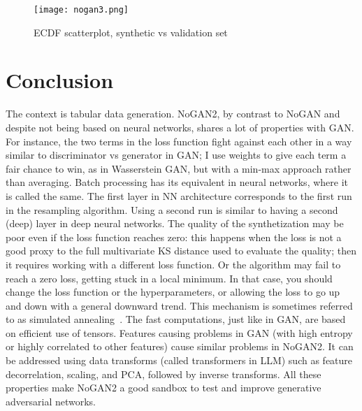 \documentclass[oneside,10pt]{book}
\begin{document}
\begin{figure}[H]
\centering
\texttt{[image: nogan3.png]} %
\caption{ECDF scatterplot, synthetic vs validation set}
\label{fig:nogan3h}
\end{figure}


\section{Conclusion}

The context is tabular data generation.
NoGAN2, by contrast to NoGAN and despite not being based on neural networks, shares a lot of properties with GAN. For instance, the two terms in the loss function fight against each other in a way similar to discriminator vs generator in GAN; I use weights to give each term a fair chance to win, as in \textcolor{index}{Wasserstein GAN}, but with a min-max approach rather than averaging. \textcolor{index}{Batch processing} has its equivalent in neural networks, where it is called the same. The first layer in NN architecture corresponds to the first run in the resampling algorithm. Using a second run is similar to having a second (deep) layer in  \textcolor{index}{deep neural networks}. The quality of the synthetization may be poor even if the \textcolor{index}{loss function} reaches zero: this happens when the loss is not a good proxy to the full multivariate KS distance used to evaluate the quality; then it requires working with a different loss function. Or the algorithm may fail to reach a zero loss, getting stuck in a local minimum. In that case, you should change the loss function or the hyperparameters, or allowing the loss to go up and down with a general downward trend. This mechanism is sometimes referred to as
\textcolor{index}{simulated annealing}~\cite{vgieee}. The fast computations, just like in GAN, are based on efficient use of tensors. Features causing problems in GAN (with high entropy or highly correlated to other features) cause similar problems in NoGAN2. It can be addressed using data transforms (called \textcolor{index}{transformers} in LLM) such as feature decorrelation, scaling,  and PCA, followed by inverse transforms. All these properties make NoGAN2 a good sandbox to test and improve generative adversarial networks.
\end{document}
